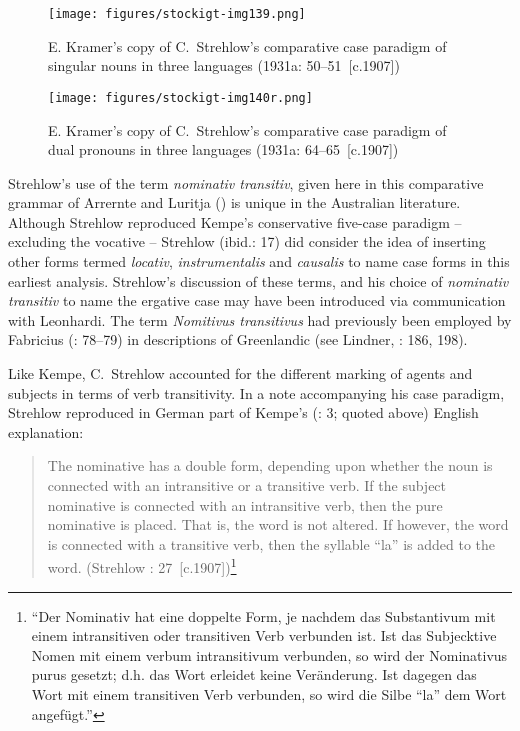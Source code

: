 \begin{figure}
\texttt{[image: figures/stockigt-img139.png]}
\caption{E. Kramer’s copy of C.~Strehlow’s comparative case paradigm of singular nouns in three languages (1931a: 50--51~[c.1907])}
\label{bkm:Ref456021367}
\label{fig:key:9-193}
\label{fig:key:193}
\end{figure}

\begin{figure}
\texttt{[image: figures/stockigt-img140r.png]}
\caption{E. Kramer’s copy of C.~Strehlow’s comparative case paradigm of dual pronouns in three languages (1931a: 64--65~[c.1907])}
\label{bkm:Ref331499049}
\label{fig:key:194}
\end{figure}

Strehlow’s use of the term \textit{nominativ transitiv}, given here in this comparative grammar of Arrernte and Luritja (\citeyear{strehlow_notitle_1910}) is unique in the Australian literature. Although Strehlow reproduced Kempe’s conservative five-case paradigm – excluding the vocative – Strehlow (ibid.: 17) did consider the idea of inserting other forms termed \textit{locativ}, \textit{instrumentalis} and \textit{causalis} to name case forms in this earliest analysis. Strehlow’s discussion of these terms, and his choice of \textit{nominativ transitiv} to name the ergative case may have been introduced via communication with Leonhardi. The term \textit{Nomitivus transitivus} had previously been employed by Fabricius (\citeyear{fabricius_forsog_1801}: 78--79) in descriptions of Greenlandic (see Lindner, \citeyear{lindner_komposition_2013}: 186, 198).

Like Kempe, C.~Strehlow accounted for the different marking of agents and subjects in terms of verb transitivity. In a note accompanying his case paradigm, Strehlow reproduced in German part of Kempe’s (\citeyear{kempe_grammar_1891}: 3; quoted above) English explanation:

\begin{quote}
The nominative has a double form, depending upon whether the noun is connected with an intransitive or a transitive verb. If the subject nominative is connected with an intransitive verb, then the pure nominative is placed. That is, the word is not altered. If however, the word is connected with a transitive verb, then the syllable “la” is added to the word. (Strehlow \citeyear{strehlow_untitled_1931}: 27~[c.1907])\footnote{“Der Nominativ hat eine doppelte Form, je nachdem das Substantivum mit einem intransitiven oder transitiven Verb verbunden ist. Ist das Subjecktive Nomen mit einem verbum intransitivum verbunden, so wird der Nominativus purus gesetzt; d.h. das Wort erleidet keine Veränderung. Ist dagegen das Wort mit einem transitiven Verb verbunden, so wird die Silbe “la” dem Wort angefügt.”}
\end{quote}

